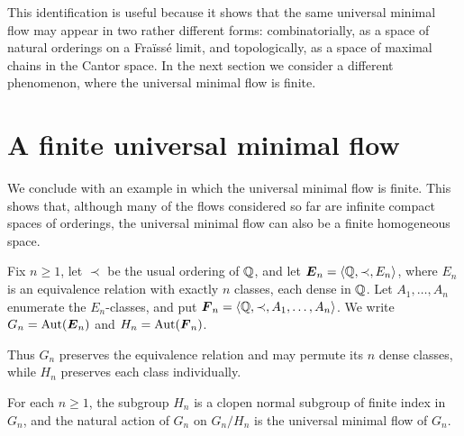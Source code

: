 This identification is useful because it shows that the same universal minimal flow may appear in two rather different forms: combinatorially, as a space of natural orderings on a Fraïssé limit, and topologically, as a space of maximal chains in the Cantor space. In the next section we consider a different phenomenon, where the universal minimal flow is finite.

\section{A finite universal minimal flow}

We conclude with an example in which the universal minimal flow is finite. This shows that, although many of the flows considered so far are infinite compact spaces of orderings, the universal minimal flow can also be a finite homogeneous space.

Fix \(n\geq 1\), let \(\prec\) be the usual ordering of \(\mathbb{Q}\), and let \(\boldsymbol{E}_n=\langle \mathbb{Q},\prec,E_n\rangle\), where \(E_n\) is an equivalence relation with exactly \(n\) classes, each dense in \(\mathbb{Q}\). Let \(A_1,\dots,A_n\) enumerate the \(E_n\)-classes, and put \(\boldsymbol{F}_n=\langle \mathbb{Q},\prec,A_1,\dots,A_n\rangle\). We write \(G_n=\operatorname{Aut}(\boldsymbol{E}_n)\) and \(H_n=\operatorname{Aut}(\boldsymbol{F}_n)\).

Thus \(G_n\) preserves the equivalence relation and may permute its \(n\) dense classes, while \(H_n\) preserves each class individually.

\begin{theorem}
\label{thm:finite-umf-gn}
For each \(n\geq 1\), the subgroup \(H_n\) is a clopen normal subgroup of finite index in \(G_n\), and the natural action of \(G_n\) on \(G_n/H_n\) is the universal minimal flow of \(G_n\).
\end{theorem}

